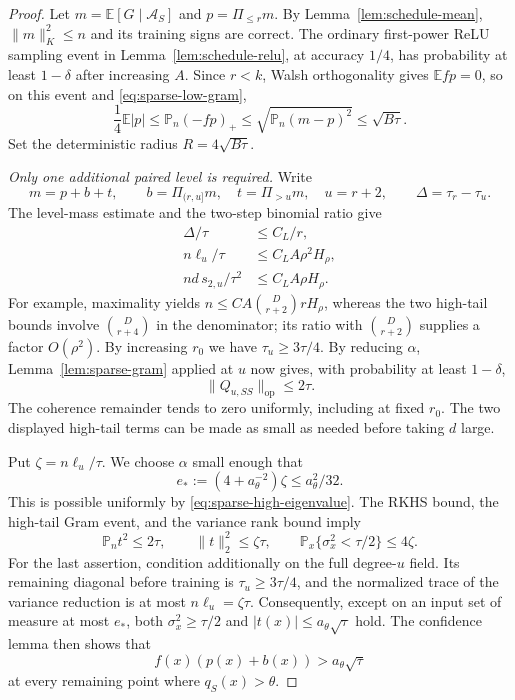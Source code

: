 \begin{proof}
Let $m=\mathbb E[G\mid\mathcal A_S]$ and $p=\Pi_{\le r}m$.
By Lemma~\ref{lem:schedule-mean}, $\|m\|_K^2\le n$ and its training
signs are correct. The ordinary first-power ReLU sampling event in
Lemma~\ref{lem:schedule-relu}, at accuracy $1/4$, has probability at
least $1-\delta$ after increasing $A$. Since $r<k$, Walsh orthogonality
gives $\mathbb E fp=0$, so on this event and
\eqref{eq:sparse-low-gram},
\begin{equation}\label{eq:sparse-head-radius}
 \frac14\mathbb E|p|
 \le\mathbb P_n(-fp)_+
 \le\sqrt{\mathbb P_n(m-p)^2}
 \le\sqrt{B\tau}.
\end{equation}
Set the deterministic radius $R=4\sqrt{B\tau}$.

\medskip\noindent
\emph{Only one additional paired level is required.}
Write
\[
 m=p+b+t,\qquad b=\Pi_{(r,u]}m,\quad t=\Pi_{>u}m,\quad u=r+2,
 \qquad \Delta=\tau_r-\tau_u.
\]
The level-mass estimate and the two-step binomial ratio give
\begin{align}
 \Delta/\tau&\le C_L/r,\label{eq:sparse-band-trace}\\
 n\ell_u/\tau&\le C_L A\rho^2H_\rho,
       \label{eq:sparse-high-eigenvalue}\\
 nd\,s_{2,u}/\tau^2&\le C_L A\rho H_\rho.
       \label{eq:sparse-high-variance}
\end{align}
For example, maximality yields
$n\le C A\binom D{r+2}rH_\rho$, whereas the two high-tail bounds
involve $\binom D{r+4}$ in the denominator; its ratio with
$\binom D{r+2}$ supplies a factor $O(\rho^2)$.
By increasing $r_0$ we have $\tau_u\ge3\tau/4$.
By reducing $\alpha$, Lemma~\ref{lem:sparse-gram} applied at $u$
now gives, with probability at least $1-\delta$,
\begin{equation}\label{eq:sparse-high-gram}
 \|Q_{u,SS}\|_{\mathrm{op}}\le2\tau.
\end{equation}
The coherence remainder tends to zero uniformly, including at fixed
$r_0$. The two displayed high-tail terms can be made as small as needed
before taking $d$ large.

Put $\zeta=n\ell_u/\tau$. We choose $\alpha$ small enough that
\begin{equation}\label{eq:sparse-zeta-choice}
 e_*:=(4+a_\theta^{-2})\zeta\le a_\theta^2/32.
\end{equation}
This is possible uniformly by \eqref{eq:sparse-high-eigenvalue}.
The RKHS bound, the high-tail Gram event, and the variance rank bound
imply
\[
 \mathbb P_n t^2\le2\tau,\qquad
 \|t\|_2^2\le\zeta\tau,
 \qquad
 \mathbb P_x\{\sigma_x^2<\tau/2\}\le4\zeta.
\]
For the last assertion, condition additionally on the full degree-$u$
field. Its remaining diagonal before training is
$\tau_u\ge3\tau/4$, and the normalized trace of the variance reduction
is at most $n\ell_u=\zeta\tau$.
Consequently, except on an input set of measure at most $e_*$, both
$\sigma_x^2\ge\tau/2$ and $|t(x)|\le a_\theta\sqrt\tau$ hold.
The confidence lemma then shows that
\begin{equation}\label{eq:sparse-confidence-margin}
 f(x)(p(x)+b(x))>a_\theta\sqrt\tau
\end{equation}
at every remaining point where $q_S(x)>\theta$.


\end{proof}
